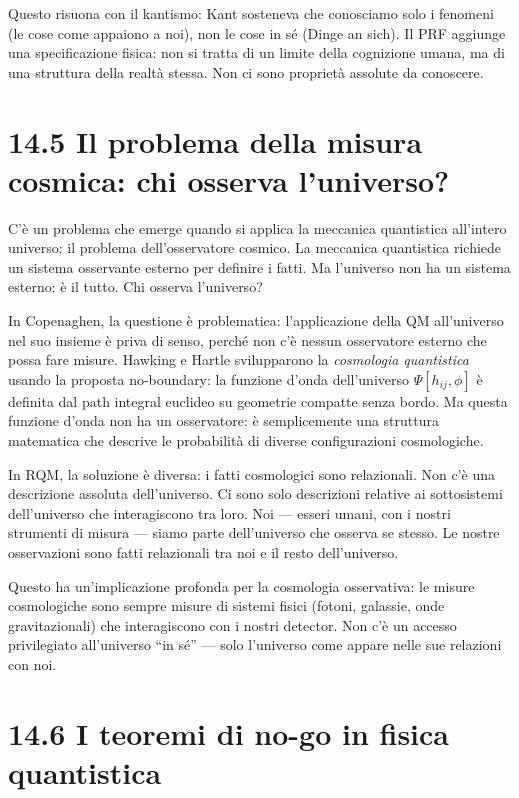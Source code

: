 \documentclass[11.5pt,a4paper,openany]{book}
\theoremstyle{remark}
\begin{document}
Questo risuona con il kantismo: Kant sosteneva che conosciamo solo i fenomeni (le cose come appaiono a noi), non le cose in sé (Dinge an sich). Il PRF aggiunge una specificazione fisica: non si tratta di un limite della cognizione umana, ma di una struttura della realtà stessa. Non ci sono proprietà assolute da conoscere.

\section{14.5 Il problema della misura cosmica: chi osserva l'universo?}

C'è un problema che emerge quando si applica la meccanica quantistica all'intero universo: il problema dell'osservatore cosmico. La meccanica quantistica richiede un sistema osservante esterno per definire i fatti. Ma l'universo non ha un sistema esterno: è il tutto. Chi osserva l'universo?

In Copenaghen, la questione è problematica: l'applicazione della QM all'universo nel suo insieme è priva di senso, perché non c'è nessun osservatore esterno che possa fare misure. Hawking e Hartle svilupparono la \textit{cosmologia quantistica} usando la proposta no-boundary: la funzione d'onda dell'universo $\Psi[h_{ij}, \phi]$ è definita dal path integral euclideo su geometrie compatte senza bordo. Ma questa funzione d'onda non ha un osservatore: è semplicemente una struttura matematica che descrive le probabilità di diverse configurazioni cosmologiche.

In RQM, la soluzione è diversa: i fatti cosmologici sono relazionali. Non c'è una descrizione assoluta dell'universo. Ci sono solo descrizioni relative ai sottosistemi dell'universo che interagiscono tra loro. Noi --- esseri umani, con i nostri strumenti di misura --- siamo parte dell'universo che osserva se stesso. Le nostre osservazioni sono fatti relazionali tra noi e il resto dell'universo.

Questo ha un'implicazione profonda per la cosmologia osservativa: le misure cosmologiche sono sempre misure di sistemi fisici (fotoni, galassie, onde gravitazionali) che interagiscono con i nostri detector. Non c'è un accesso privilegiato all'universo ``in sé'' --- solo l'universo come appare nelle sue relazioni con noi.

\section{14.6 I teoremi di no-go in fisica quantistica}
\end{document}
